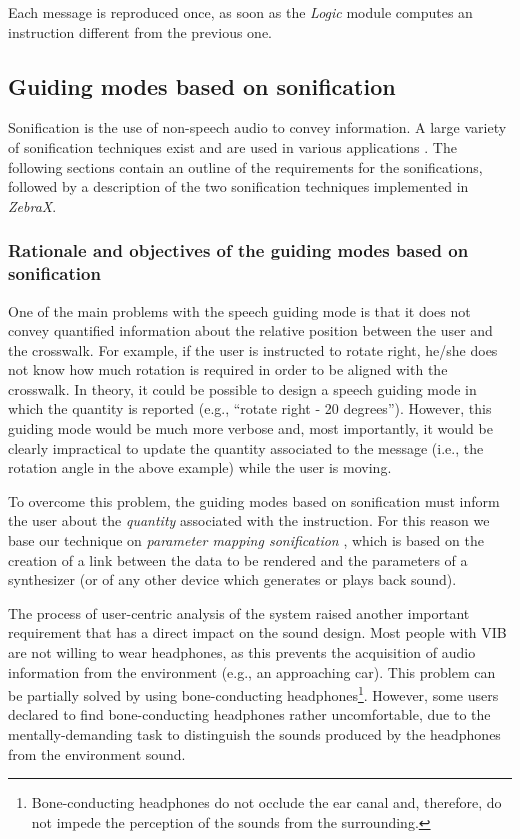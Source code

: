 \documentclass{article}
\newcommand{\logic}{\emph{Logic}}
\newcommand{\zebra}{\emph{ZebraX}}
\begin{document}
Each message is reproduced once, as soon as the \logic{} module computes an instruction different from the previous one.

\subsection{Guiding modes based on sonification}
Sonification is the use of non-speech audio to convey information. A large variety of sonification techniques exist and are used in various applications \cite{kramer1993auditory,csapo}.
The following sections contain an outline of the requirements for the sonifications, followed by a description of the two sonification techniques implemented in \zebra{}.

\subsubsection{Rationale and objectives of the guiding modes based on sonification}
One of the main problems with the speech guiding mode is that it does not convey quantified information about the relative position between the user and the crosswalk. For example, if the user is instructed to rotate right, he/she does not know how much rotation is required in order to be aligned with the crosswalk.
In theory, it could be possible to design a speech guiding mode in which the quantity is reported (e.g., ``rotate right - 20 degrees''). However, this guiding mode would be much more verbose and, most importantly, it would be clearly impractical to update the quantity associated to the message (i.e., the rotation angle in the above example) while the user is moving.

To overcome this problem, the guiding modes based on sonification must inform the user about the \emph{quantity} associated with the instruction.
For this reason we base our technique on \emph{parameter mapping sonification}  \cite{HermanRitter1999}, which is based on the creation of a link between the data to be rendered and the parameters of a synthesizer (or of any other device which generates or plays back sound).

The process of user-centric analysis of the system raised another important requirement that has a direct impact on the sound design. Most people with VIB are not willing to wear headphones, as this prevents the acquisition of audio information from the environment (e.g., an approaching car).
This problem can be partially solved by using bone-conducting headphones\footnote{Bone-conducting headphones do not occlude the ear canal and, therefore, do not impede the perception of the sounds from the surrounding.}.
However, some users declared to find bone-conducting headphones rather uncomfortable, due to the mentally-demanding task to distinguish the sounds produced by the headphones from the environment sound.
\end{document}
